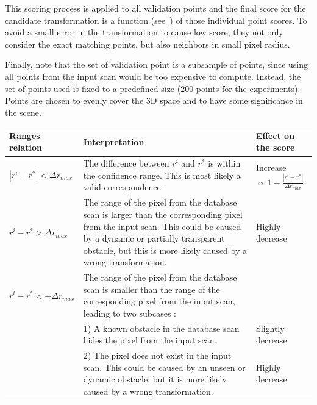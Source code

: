 This scoring process is applied to all validation points and the final score for the candidate transformation is a function (see~\citep[Equation~1]{Steder2011b}) of those individual point scores. To avoid a small error in the transformation to cause low score, they not only consider the exact matching points, but also neighbors in small pixel radius.

Finally, note that the set of validation point is a subsample of points, since using all points from the input scan would be too expensive to compute. Instead, the set of points used is fixed to a predefined size (200 points for the experiments). Points are chosen to evenly cover the 3D space and to have some significance in the scene. 

\begin{table}[H]
    \centering
    \begin{tabular}{@{}p{}p{}p{}@{}}
        \toprule %
        \textbf{Ranges relation}         & \textbf{Interpretation}                                                                                                    & \textbf{Effect on the score} \\
        \hline
        $|r^i - r^*| < \Delta r_{max}$   & The difference between $r^i$ and $r^*$ is within the confidence range. This is most likely a valid correspondence.      & Increase $\propto 1-\frac{|r^i-r^*|}{\Delta r_{max}}$ \\
        $r^i - r^* > \Delta r_{max}$     & The range of the pixel from the database scan is larger than the corresponding pixel from the input scan. This could be caused by a dynamic or partially transparent obstacle, but this is more likely caused by a wrong transformation. & Highly decrease \\
        $r^i - r^* < -\Delta r_{max}$    & The range of the pixel from the database scan is smaller than the range of the corresponding pixel from the input scan, leading to two subcases : & \\
                                         & 1) A known obstacle in the database scan hides the pixel from the input scan.                                           & Slightly decrease \\
                                         & 2) The pixel does not exist in the input scan. This could be caused by an unseen or dynamic obstacle, but it is more likely caused by a wrong transformation.       & Highly decrease \\

\end{tabular}
\end{table}

